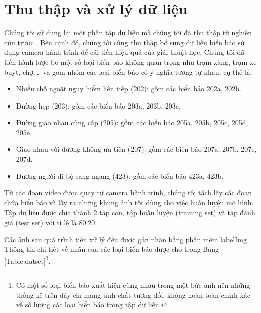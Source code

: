 \documentclass[../thesis.tex]{subfiles}
\begin{document}
\section{Thu thập và xử lý dữ liệu}

Chúng tôi sử dụng lại một phần tập dữ liệu mà chúng tôi đã thu thập từ nghiên cứu trước \cite{faster-rcnn-nngbao-dldien}. Bên cạnh đó, chúng tôi cũng thu thập bổ sung dữ liệu biển báo sử dụng camera hành trình để cải tiến hiệu quả của giải thuật học. Chúng tôi đã tiến hành lược bỏ một số loại biển báo không quan trọng như trạm xăng, trạm xe buýt, chợ,\ldots\ và gom nhóm các loại biển báo có ý nghĩa tương tự nhau, cụ thể là:

\begin{itemize}[topsep=0pt]
    \item Nhiều chỗ ngoặt nguy hiểm liên tiếp (202): gồm các biển báo 202a, 202b.
    \item Đường hẹp (203): gồm các biển báo 203a, 203b, 203c.
    \item Đường giao nhau cùng cấp (205): gồm các biển báo 205a, 205b, 205c, 205d, 205e.
    \item Giao nhau với đường không ưu tiên (207): gồm các biển báo 207a, 207b, 207c, 207d.
    \item Đường người đi bộ sang ngang (423): gồm các biển báo 423a, 423b.
\end{itemize} 

Từ các đoạn video được quay từ camera hành trình, chúng tôi tách lấy các đoạn chứa biển báo và lấy ra những khung ảnh tốt dùng cho việc huấn luyện mô hình. Tập dữ liệu được chia thành 2 tập con, tập huấn luyện (training set) và tập đánh giá (test set) với tỉ lệ là 80:20.

Các ảnh sau quá trình tiền xử lý đều được gán nhãn bằng phần mềm labelImg \cite{labelImg}. Thông tin chi tiết về nhãn của các loại biển báo được cho trong Bảng \ref{Table:datset}\footnote{Có một số loại biển báo xuất hiện cùng nhau trong một bức ảnh nên những thống kê trên đây chỉ mang tính chất tương đối, không hoàn toàn chính xác về số lượng các loại biển báo trong tập dữ liệu.}.
\end{document}
